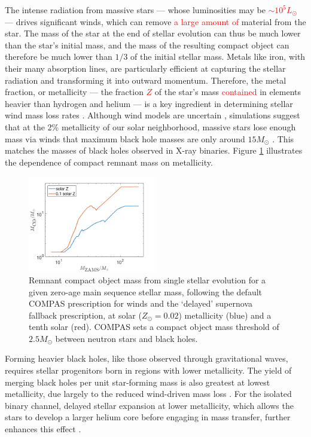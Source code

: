 \documentclass[iop,onecolumn]{revtex4}
\newcommand{\ajf}[1]{\textcolor{red}{#1}}
\begin{document}
The intense radiation from massive stars --- whose luminosities may be \ajf{$\sim 10^5 L_\odot$} --- drives significant winds, which can remove \ajf{a large amount of} material from the star. The mass of the star at the end of stellar evolution can thus be much lower than the star's initial mass, and the mass of the resulting compact object can therefore be much lower than $1/3$ of the initial stellar mass. Metals like iron, with their many absorption lines, are particularly efficient at capturing the stellar radiation and transforming it into outward momentum.  Therefore, the metal fraction, or metallicity  --- the fraction \ajf{$Z$} of the star's mass \ajf{contained} in elements heavier than hydrogen and helium --- is a key ingredient in determining stellar wind mass loss rates \citep{Vink:2001}. Although wind models are uncertain \citep[e.g.,][]{Renzo:2017}, simulations suggest that at the 2\% metallicity of our solar neighborhood, massive stars lose enough mass via winds that maximum black hole masses are only around $15 M_\odot$ \citep{Belczynski:2009,Spera:2015}. This matches the masses of black holes observed in X-ray binaries. Figure \ref{fig:BHremnant} illustrates the dependence of compact remnant mass on metallicity. 
 
\begin{figure}
	\centering
	\includegraphics[width=0.5\textwidth]{BHremnantdelayed.png}
	\caption{\label{fig:BHremnant} Remnant compact object mass from single stellar evolution for a given zero-age main sequence stellar mass, following the default COMPAS prescription for winds \citep{Stevenson:2017}  and the `delayed' \citet{Fryer:2012} supernova fallback prescription, at solar ($Z_\odot=0.02$) metallicity (blue) and a tenth solar (red).  COMPAS sets a compact object mass threshold of $2.5 M_\odot$ between neutron stars and black holes.
	} 
\end{figure}

Forming heavier black holes, like those observed through gravitational waves, requires stellar progenitors born in regions with lower metallicity. The yield of merging black holes per unit star-forming mass is also greatest at lowest metallicity, due largely to the reduced wind-driven mass loss \citep[e.g.,][]{Belczynski:2010,Kruckow:2018}. For the isolated binary channel, delayed stellar expansion at lower metallicity, which allows the stars to develop a larger helium core before engaging in mass transfer, further enhances this effect \citep[e.g.,][]{Stevenson:2017}.
\end{document}
